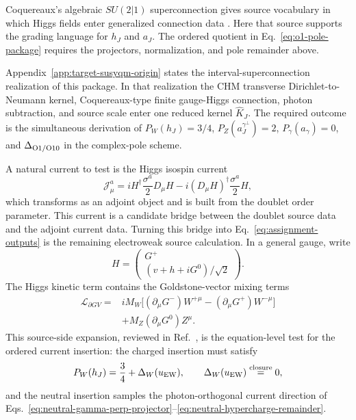 Coquereaux's algebraic \(SU(2|1)\) superconnection gives source vocabulary in
which Higgs fields enter generalized connection data
\cite{Coquereaux1992Superconnections}.  Here that source supports the grading
language for \(h_J\) and \(a_J\).  The ordered quotient in
Eq.~\eqref{eq:o1-pole-package} requires the projectors, normalization, and
pole remainder above.

Appendix~\ref{app:target-susyqm-origin} states the
interval-superconnection realization of this package.  In that realization the
CHM transverse Dirichlet-to-Neumann kernel, Coquereaux-type finite gauge-Higgs
connection, photon subtraction, and source scale enter one reduced kernel
\(\widehat K_J\).  The required outcome is the simultaneous derivation of
\(P_W(h_J)=3/4\), \(P_Z(a_J^{\gamma^\perp})=2\), \(P_\gamma(a_\gamma)=0\), and
\(\Delta_{\rm O1/O10}\) in the complex-pole scheme.

A natural current to test is the Higgs isospin current
\begin{equation}
  \mathcal J^a_\mu
  =
  i H^\dagger\frac{\sigma^a}{2}D_\mu H
  -i(D_\mu H)^\dagger\frac{\sigma^a}{2}H,
  \label{eq:higgs-isospin-current}
\end{equation}
which transforms as an adjoint object and is built from the doublet order
parameter.  This current is a candidate bridge between the doublet source data
and the adjoint current data.  Turning this bridge into
Eq.~\eqref{eq:assignment-outputs} is the remaining electroweak source calculation.
In a general gauge, write
\[
  H=\begin{pmatrix}G^+\\(v+h+iG^0)/\sqrt2\end{pmatrix}.
\]
The Higgs kinetic term contains the Goldstone-vector mixing terms
\begin{equation}
  \begin{aligned}
  \mathcal L_{\partial G V}
  ={}&
  iM_W\big[(\partial_\mu G^-)W^{+\mu}
  -(\partial_\mu G^+)W^{-\mu}\big]
  \\
  &+M_Z(\partial_\mu G^0)Z^\mu .
  \end{aligned}
  \label{eq:goldstone-vector-mixing}
\end{equation}
This source-side expansion, reviewed in Ref.~\cite{Logan2022}, is the
equation-level test for the ordered current insertion: the charged insertion
must satisfy
\begin{equation}
  P_W(h_J)=\frac34+\Delta_W(u_{\rm EW}),
  \qquad
  \Delta_W(u_{\rm EW})\stackrel{\rm closure}{=}0,
  \label{eq:charged-goldstone-projector-target}
\end{equation}
and the neutral insertion samples the photon-orthogonal current direction of
Eqs.~\eqref{eq:neutral-gamma-perp-projector}--\eqref{eq:neutral-hypercharge-remainder}.
